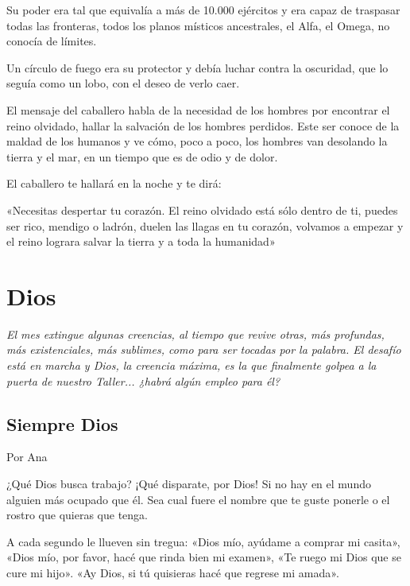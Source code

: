 \documentclass[11pt,twoside,openright,a5paper]{book}
\begin{document}
Su poder era tal que equivalía a más de 10.000 ejércitos y era capaz de  traspasar  todas las fronteras, todos los planos místicos ancestrales, el Alfa, el Omega, no conocía de límites.

Un círculo de fuego era su protector y debía luchar contra la oscuridad, que lo seguía como un lobo, con el deseo de verlo caer.

El mensaje del caballero habla de la necesidad de los hombres por encontrar el reino olvidado, hallar la salvación de los hombres perdidos. Este ser conoce de la maldad de los humanos y ve cómo, poco a poco, los hombres van desolando la tierra y el mar, en un tiempo que es de odio y de dolor.

El caballero te hallará en la noche y te dirá: 

«Necesitas despertar tu corazón. El reino olvidado está sólo dentro de ti, puedes ser rico, mendigo o ladrón, duelen las llagas en tu corazón, volvamos a empezar y el reino lograra salvar la tierra y a toda la humanidad»

\chapter*{Dios}

\vspace{0.5cm}
\emph{El mes extingue algunas creencias, al tiempo que revive otras, más profundas, más existenciales, más sublimes, como para ser tocadas por la palabra. El desafío está en marcha y Dios, la creencia máxima, es la que finalmente golpea a la puerta de nuestro Taller... ¿habrá algún empleo para él?}

\section*{Siempre Dios}

                                                                                                          \begin{flushright}Por Ana\end{flushright}

¿Qué Dios busca trabajo? ¡Qué disparate, por Dios! Si no hay en el mundo alguien más ocupado que él. Sea cual fuere el nombre que te guste ponerle o el rostro que quieras que tenga.

A  cada segundo le llueven sin tregua: «Dios mío, ayúdame a comprar mi casita», «Dios mío, por favor, hacé que rinda bien mi examen», «Te ruego mi Dios que se cure mi hijo». «Ay Dios, si tú quisieras hacé que regrese mi amada».
\end{document}
